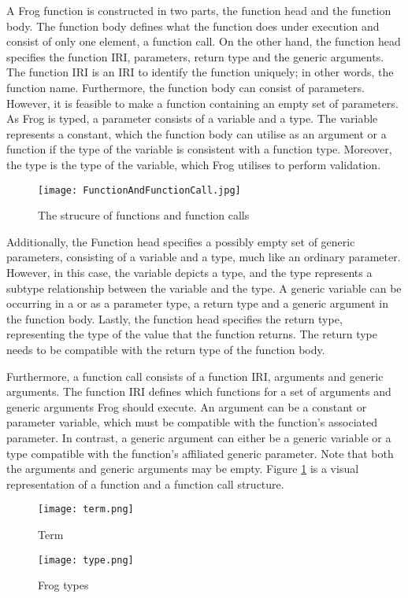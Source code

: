 \para
A Frog function is constructed in two parts, the function head and the function body. The function body defines what the function does under execution and consist of only one element, a function call. On the other hand, the function head specifies the function IRI, parameters, return type and the generic arguments. The function IRI is an IRI to identify the function uniquely; in other words, the function name. Furthermore, the function body can consist of parameters. However, it is feasible to make a function containing an empty set of parameters. As Frog is typed, a parameter consists of a variable and a type. The variable represents a constant, which the function body can utilise as an argument or a function if the type of the variable is consistent with a function type. Moreover, the type is the type of the variable, which Frog utilises to perform validation.

\begin{figure}[h]
    \centering
    \texttt{[image: FunctionAndFunctionCall.jpg]}
    \caption{The strucure of functions and function calls}
    \label{fig:functionCall_and_function}
\end{figure}

\para
Additionally, the Function head specifies a possibly empty set of generic parameters, consisting of a variable and a type, much like an ordinary parameter. However, in this case, the variable depicts a type, and the type represents a subtype relationship between the variable and the type. A generic variable can be occurring in a or as a parameter type, a return type and a generic argument in the function body. Lastly, the function head specifies the return type, representing the type of the value that the function returns. The return type needs to be compatible with the return type of the function body. 

\para
Furthermore, a function call consists of a function IRI, arguments and generic arguments. The function IRI defines which functions for a set of arguments and generic arguments Frog should execute. An argument can be a constant or parameter variable, which must be compatible with the function's associated parameter. In contrast, a generic argument can either be a generic variable or a type compatible with the function's affiliated generic parameter. Note that both the arguments and generic arguments may be empty. Figure \ref{fig:functionCall_and_function} is a visual representation of a function and a function call structure. 

\begin{figure}
    \centering
    \begin{minipage}{.5\textwidth}
      \centering
      \texttt{[image: term.png]}
      \caption{Term}
      \label{fig:term}
    \end{minipage}%
    \begin{minipage}{.5\textwidth}
      \centering
      \texttt{[image: type.png]}
      \caption{Frog types}
      \label{fig:type}
    \end{minipage}
\end{figure}

